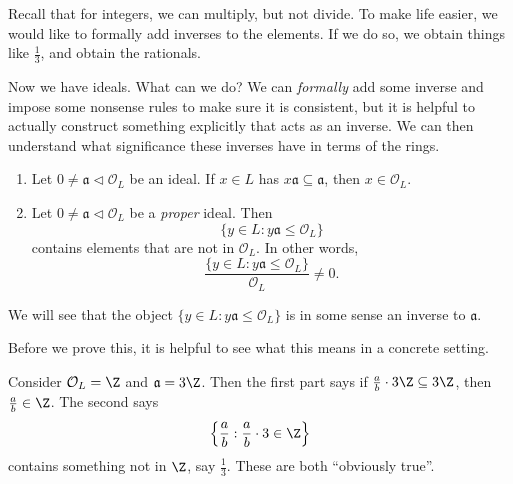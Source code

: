 \documentclass[a4paper]{article}
\begin{document}
Recall that for integers, we can multiply, but not divide. To make life easier, we would like to formally add inverses to the elements. If we do so, we obtain things like $\frac{1}{3}$, and obtain the rationals.

Now we have ideals. What can we do? We can \emph{formally} add some inverse and impose some nonsense rules to make sure it is consistent, but it is helpful to actually construct something explicitly that acts as an inverse. We can then understand what significance these inverses have in terms of the rings.

\begin{prop}\leavevmode
  \begin{enumerate}
    \item Let $0 \not= \mathfrak{a} \lhd \mathcal{O}_L$ be an ideal. If $x \in L$ has $x\mathfrak{a} \subseteq \mathfrak{a}$, then $x \in \mathcal{O}_L$.
    \item Let $0 \not= \mathfrak{a} \lhd \mathcal{O}_L$ be a \emph{proper} ideal. Then
      \[
        \{y \in L: y \mathfrak{a} \leq \mathcal{O}_L\}
      \]
      contains elements that are not in $\mathcal{O}_L$. In other words,
      \[
        \frac{\{y \in L: y \mathfrak{a} \leq \mathcal{O}_L\}}{\mathcal{O}_L} \not = 0.
      \]
  \end{enumerate}
\end{prop}
We will see that the object $\{y \in L: y \mathfrak{a} \leq \mathcal{O}_L\}$ is in some sense an inverse to $\mathfrak{a}$.

Before we prove this, it is helpful to see what this means in a concrete setting.
\begin{eg}
  Consider $\mathcal{O}_L = \Z$ and $\mathfrak{a} = 3\Z$. Then the first part says if $\frac{a}{b} \cdot 3\Z \subseteq 3\Z$, then $\frac{a}{b} \in \Z$. The second says
  \[
    \left\{\frac{a}{b}: \frac{a}{b}\cdot 3 \in \Z\right\}
  \]
  contains something not in $\Z$, say $\frac{1}{3}$. These are both ``obviously true''.
\end{eg}
\end{document}
